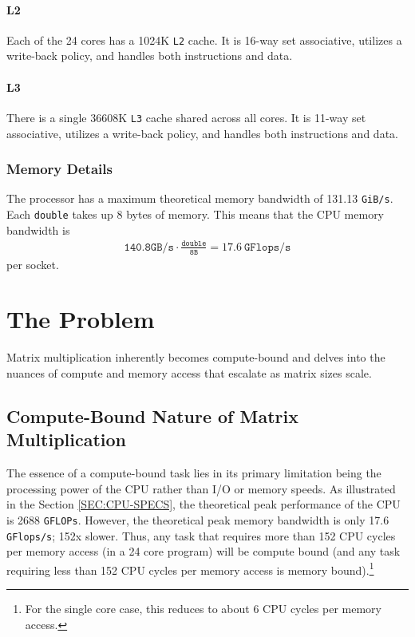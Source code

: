 \documentclass{article}
\begin{document}
\paragraph{L2}
Each of the 24 cores has a 1024K \texttt{L2} cache. It is 16-way set associative, utilizes a write-back policy, and handles both instructions and data.

\paragraph{L3}
There is a single 36608K \texttt{L3} cache shared across all cores. It is 11-way set associative, utilizes a write-back policy, and handles both instructions and data.

\subsubsection*{Memory Details}
The processor has a maximum theoretical memory bandwidth of 131.13 \texttt{GiB/s}. 
Each \texttt{double} takes up 8 bytes of memory. This means that the CPU memory bandwidth is 
\begin{align*}
    \texttt{140.8GB/s} \cdot \frac{\texttt{double}}{\texttt{8B}} = 17.6\ \texttt{GFlops/s}
\end{align*}
per socket. 

\section{The Problem}

Matrix multiplication inherently becomes compute-bound and delves into the 
nuances of compute and memory access that escalate as matrix sizes scale.

\subsection{Compute-Bound Nature of Matrix Multiplication}

The essence of a compute-bound task lies in its primary limitation being the 
processing power of the CPU rather than I/O or memory speeds. As illustrated in the Section \ref{SEC:CPU-SPECS}, the theoretical peak performance of the CPU is
2688 \texttt{GFLOPs}. However, the theoretical peak memory bandwidth is only 17.6 \texttt{GFlops/s};
152x slower. Thus, any task that requires more than 152 CPU cycles per memory access (in a 24 core program) will be
compute bound (and any task requiring less than 152 CPU cycles per memory access is memory bound).\footnote{
    For the single core case, this reduces to about 6 CPU cycles per memory access.
}
\end{document}
